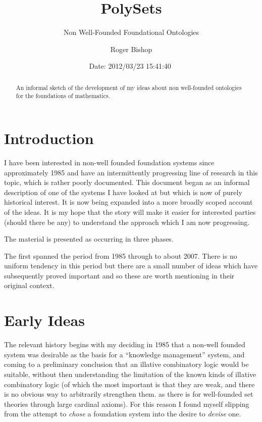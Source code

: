 \documentclass{article}
\begin{document}
                                                                                   
\begin{article}
\begin{opening}  
\title{PolySets}
\subtitle{Non Well-Founded Foundational Ontologies}
\author{Roger Bishop }
\date{$ $Date: 2012/03/23 15:41:40 $ $}

\begin{abstract}
An informal sketch of the development of my ideas about non well-founded ontologies for the foundations of mathematics.
\end{abstract}
\end{opening}

\setcounter{tocdepth}{3}
{\parskip-0pt\tableofcontents}

\section{Introduction}

I have been interested in non-well founded foundation systems since approximately 1985 and have an intermittently progressing line of research in this topic, which is rather poorly documented.
This document began as an informal description of one of the systems I have looked at but which is now of purely historical interest.
It is now being expanded into a more broadly scoped account of the ideas.
It is my hope that the story will make it easier for interested parties (should there be any) to understand the approach which I am now progressing.

The material is presented as occurring in three phases.

The first spanned the period from 1985 through to about 2007.
There is no uniform tendency in this period but there are a small number of ideas which have subsequently proved important and so these are worth mentioning in their original context.


\section{Early Ideas}

The relevant history begins with my deciding in 1985 that a non-well founded system was desirable as the basis for a ``knowledge management'' system, and coming to a preliminary conclusion that an illative combinatory logic would be suitable, without then understanding the limitation of the known kinds of illative combinatory logic (of which the most important is that they are weak, and there is no obvious way to arbitrarily strengthen them. as there is for well-founded set theories through large cardinal axioms).
For this reason I found myself slipping from the attempt to \emph{chose} a foundation system into the desire to \emph{devise} one.



\end{article}
\end{document}
